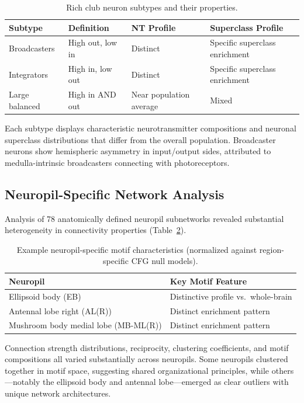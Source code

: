 \documentclass[11pt]{article}
\begin{document}
\begin{table}[ht]
\centering
\caption{Rich club neuron subtypes and their properties.}
\label{tab:richclub}
\begin{tabular}{@{}llll@{}}
\toprule
Subtype & Definition & NT Profile & Superclass Profile \\
\midrule
Broadcasters & High out, low in & Distinct & Specific superclass enrichment \\
Integrators & High in, low out & Distinct & Specific superclass enrichment \\
Large balanced & High in AND out & Near population average & Mixed \\
\bottomrule
\end{tabular}
\end{table}

Each subtype displays characteristic neurotransmitter compositions and neuronal superclass distributions that differ from the overall population.  Broadcaster neurons show hemispheric asymmetry in input/output sides, attributed to medulla-intrinsic broadcasters connecting with photoreceptors.

\subsection{Neuropil-Specific Network Analysis}

Analysis of 78 anatomically defined neuropil subnetworks revealed substantial heterogeneity in connectivity properties (Table~\ref{tab:neuropil}).

\begin{table}[ht]
\centering
\caption{Example neuropil-specific motif characteristics (normalized against region-specific CFG null models).}
\label{tab:neuropil}
\begin{tabular}{@{}ll@{}}
\toprule
Neuropil & Key Motif Feature \\
\midrule
Ellipsoid body (EB) & Distinctive profile vs.\ whole-brain \\
Antennal lobe right (AL(R)) & Distinct enrichment pattern \\
Mushroom body medial lobe (MB-ML(R)) & Distinct enrichment pattern \\
\bottomrule
\end{tabular}
\end{table}

Connection strength distributions, reciprocity, clustering coefficients, and motif compositions all varied substantially across neuropils.  Some neuropils clustered together in motif space, suggesting shared organizational principles, while others---notably the ellipsoid body and antennal lobe---emerged as clear outliers with unique network architectures.
\end{document}
